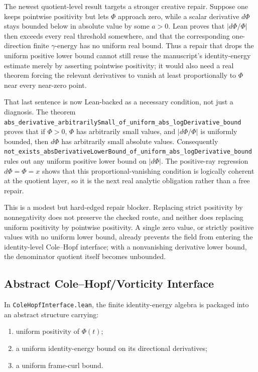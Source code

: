 \documentclass[11pt]{article}
\begin{document}
The newest quotient-level result targets a stronger creative repair.  Suppose
one keeps pointwise positivity but lets \(\Phi\) approach zero, while a scalar
derivative \(d\Phi\) stays bounded below in absolute value by some \(a>0\).
Lean proves that \(|d\Phi/\Phi|\) then exceeds every real threshold somewhere,
and that the corresponding one-direction finite \(\gamma\)-energy has no
uniform real bound.  Thus a repair that drops the uniform positive lower bound
cannot still reuse the manuscript's identity-energy estimate merely by
asserting pointwise positivity; it would also need a real theorem forcing the
relevant derivatives to vanish at least proportionally to \(\Phi\) near every
near-zero point.

That last sentence is now Lean-backed as a necessary condition, not just a
diagnosis.  The theorem
\texttt{abs\_derivative\_arbitrarilySmall\_of\_uniform\_abs\_logDerivative\_bound}
proves that if \(\Phi>0\), \(\Phi\) has arbitrarily small values, and
\(|d\Phi/\Phi|\) is uniformly bounded, then \(d\Phi\) has arbitrarily small
absolute values.  Consequently
\texttt{not\_exists\_absDerivativeLowerBound\_of\_uniform\_abs\_logDerivative\_bound}
rules out any uniform positive lower bound on \(|d\Phi|\).  The positive-ray
regression \(d\Phi=\Phi=x\) shows that this proportional-vanishing condition is
logically coherent at the quotient layer, so it is the next real analytic
obligation rather than a free repair.

This is a modest but hard-edged repair blocker.  Replacing strict positivity
by nonnegativity does not preserve the checked route, and neither does
replacing uniform positivity by pointwise positivity.  A single zero value, or
strictly positive values with no uniform lower bound, already prevents the field
from entering the identity-level Cole--Hopf interface; with a nonvanishing
derivative lower bound, the denominator quotient itself becomes unbounded.

\subsection{Abstract Cole--Hopf/Vorticity Interface}

In \texttt{ColeHopfInterface.lean}, the finite identity-energy algebra is
packaged into an abstract structure carrying:
\begin{enumerate}[leftmargin=1.5em]
  \item uniform positivity of \(\Phi(t)\);
  \item a uniform identity-energy bound on its directional derivatives;
  \item a uniform frame-curl bound.
\end{enumerate}
\end{document}
